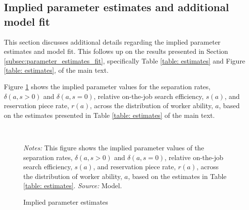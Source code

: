 \clearpage
\subsection{Implied parameter estimates and additional model fit\label{app_subsec:model_fit}}

This section discusses additional details regarding the implied parameter estimates and model fit. This follows up on the results presented in Section \ref{subsec:parameter_estimates_fit}, specifically Table \ref{table: estimates} and Figure \ref{table: estimates}, of the main text.

Figure \ref{fig:implied_parameters} shows the implied parameter values for the separation rates, $\delta(a,s>0)$ and $\delta(a,s=0)$, relative on-the-job search efficiency, $s(a)$, and reservation piece rate, $r(a)$, across the distribution of worker ability, $a$, based on the estimates presented in Table \ref{table: estimates} of the main text.

\begin{figure}[!htb]
  \centering
  \caption{Implied parameter estimates\label{fig:implied_parameters}}
  \prefigvspace
  \\
  \postfigvspace
  \begin{minipage}[t]{1\columnwidth}%
    \begin{spacing}{0.75}
      \emph{\scriptsize{}Notes: }{\scriptsize{}This figure shows the implied parameter values of the separation rates, $\delta(a,s>0)$ and $\delta(a,s=0)$, relative on-the-job search efficiency, $s(a)$, and reservation piece rate, $r(a)$, across the distribution of worker ability, $a$, based on the estimates in Table \ref{table: estimates}. %
      \emph{\scriptsize{}Source: } Model.}
    \end{spacing}
  \end{minipage}
\end{figure}


